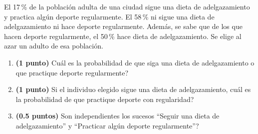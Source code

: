 
El 17\,\% de la población adulta de una ciudad sigue una dieta de
adelgazamiento y practica algún deporte regularmente. El 58\,\% ni sigue
una dieta de adelgazamiento ni hace deporte regularmente. Además, se sabe
que de los que hacen deporte regularmente, el 50\,\% hace dieta de
adelgazamiento. Se elige al azar un adulto de esa población.

\begin{enumerate}[label=\alph*)]
  \item \textbf{(1 punto)} \textquestiondown{}Cuál es la probabilidad de que
  siga una dieta de adelgazamiento o que practique deporte regularmente?
  \item \textbf{(1 punto)} Si el individuo elegido sigue una dieta de
  adelgazamiento, \textquestiondown{}cuál es la probabilidad de que practique
  deporte con regularidad?
  \item \textbf{(0.5 puntos)} \textquestiondown{}Son independientes los sucesos
  ``Seguir una dieta de adelgazamiento'' y ``Practicar algún deporte
  regularmente''?
\end{enumerate}
